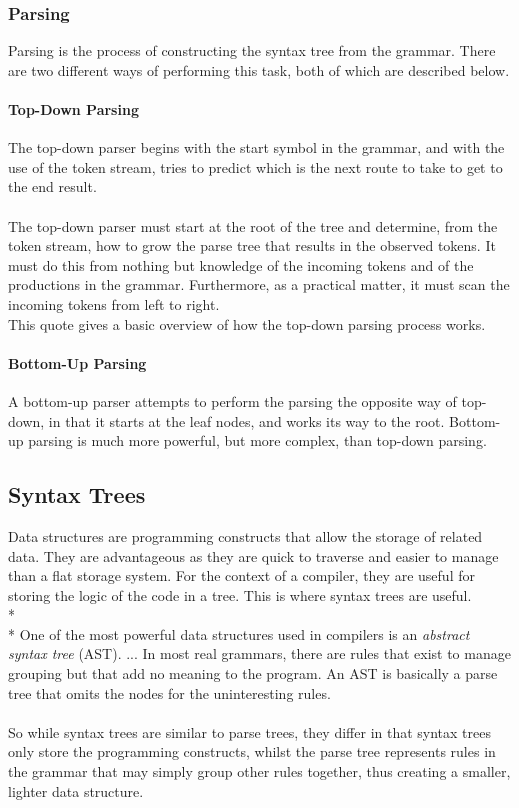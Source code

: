 \documentclass[12pt]{report}
\begin{document}
\subsubsection{Parsing}\label{subsec:parsing}
Parsing is the process of constructing the syntax tree from the grammar.  There are two different ways of performing this task, both of which are described below.
\paragraph{Top-Down Parsing}
The top-down parser begins with the start symbol in the grammar, and with the use of the token stream, tries to predict which is the next route to take to get to the end result.\\
\\
The top-down parser must start at the root of the tree and determine, from the token stream, how to grow the parse tree that results in the observed tokens.  It must do this from nothing but knowledge of the incoming tokens and of the productions in the grammar.  Furthermore, as a practical matter, it must scan the incoming tokens from left to right. \citep{compilerconstruction92}
\\
This quote gives a basic overview of how the top-down parsing process works.
\paragraph{Bottom-Up Parsing}
A bottom-up parser attempts to perform the parsing the opposite way of top-down, in that it starts at the leaf nodes, and works its way to the root.  Bottom-up parsing is much more powerful, but more complex, than top-down parsing.
\subsection{Syntax Trees}\label{subsec:syntax_trees}
Data structures are programming constructs that allow the storage of related data.  They are advantageous as they are quick to traverse and easier to manage than a flat storage system.  For the context of a compiler, they are useful for storing the logic of the code in a tree.  This is where syntax trees are useful.\\*
\\*
One of the most powerful data structures used in compilers is an \textit{abstract syntax tree} (AST). ... In most real grammars, there are rules that exist to manage grouping but that add no meaning to the program.  An AST is basically a parse tree that omits the nodes for the uninteresting rules. \citep{flexandbison09}\\
\\
So while syntax trees are similar to parse trees, they differ in that syntax trees only store the programming constructs, whilst the parse tree represents rules in the grammar that may simply group other rules together, thus creating a smaller, lighter data structure.\\
\\
\end{document}
